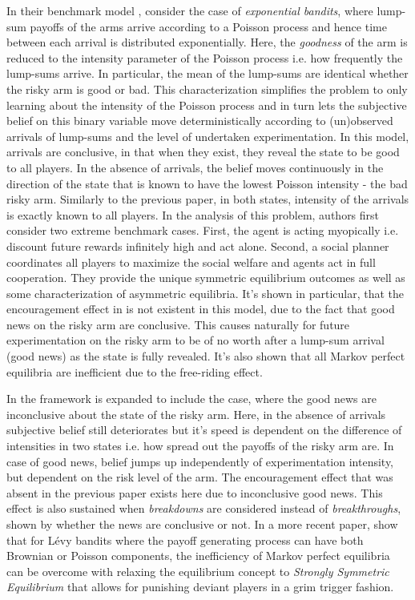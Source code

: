 In their benchmark model \cite{keller2005strategic}, consider the case of \textit{exponential bandits}, where lump-sum payoffs of the arms arrive according to a Poisson process and hence time between each arrival is distributed exponentially. Here, the \textit{goodness} of the arm is reduced to the intensity parameter of the Poisson process i.e. how frequently the lump-sums arrive. In particular, the mean of the lump-sums are identical whether the risky arm is good or bad. This characterization simplifies the problem to only learning about the intensity of the Poisson process and in turn lets the subjective belief on this binary variable move deterministically according to (un)observed arrivals of lump-sums and the level of undertaken experimentation. In this model, arrivals are conclusive, in that when they exist, they reveal the state to be good to all players. In the absence of arrivals, the belief moves continuously in the direction of the state that is known to have the lowest Poisson intensity - the bad risky arm. Similarly to the previous paper, in both states, intensity of the arrivals is exactly known to all players. In the analysis of this problem, authors first consider two extreme benchmark cases. First, the agent is acting myopically i.e. discount future rewards infinitely high and act alone. Second, a social planner coordinates all players to maximize the social welfare and agents act in full cooperation. They provide the unique symmetric equilibrium outcomes as well as some characterization of asymmetric equilibria. It's shown in particular, that the encouragement effect in \cite{bolton1999strategic} is not existent in this model, due to the fact that good news on the risky arm are conclusive. This causes naturally for future experimentation on the risky arm to be of no worth after a lump-sum arrival (good news) as the state is fully revealed. It's also shown that all Markov perfect equilibria are inefficient due to the free-riding effect.

In \cite{keller2010strategic} the framework is expanded to include the case, where the good news are inconclusive about the state of the risky arm. Here, in the absence of arrivals subjective belief still deteriorates but it's speed is dependent on the difference of intensities in two states i.e. how spread out the payoffs of the risky arm are. In case of good news, belief jumps up independently of experimentation intensity, but dependent on the risk level of the arm. The encouragement effect that was absent in the previous paper exists here due to inconclusive good news. This effect is also sustained when \textit{breakdowns} are considered instead of \textit{breakthroughs}, shown by \cite{keller2015breakdowns} whether the news are conclusive or not. In a more recent paper, \cite{horner2022overcoming} show that for Lévy bandits where the payoff generating process can have both Brownian or Poisson components, the inefficiency of Markov perfect equilibria can be overcome with relaxing the equilibrium concept to \textit{Strongly Symmetric Equilibrium} that allows for punishing deviant players in a grim trigger fashion.

